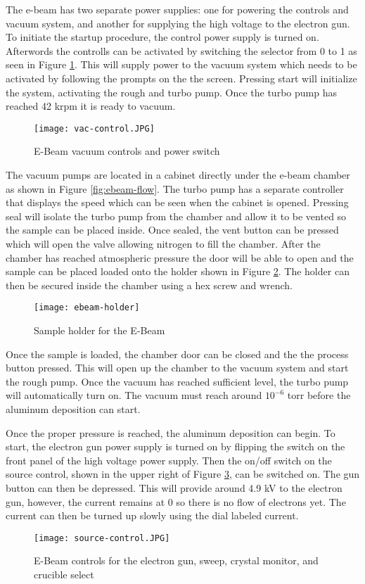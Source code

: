 The e-beam has two separate power supplies: one for powering the controls and vacuum system, and another for supplying the high voltage to the electron gun.
To initiate the startup procedure, the control power supply is turned on.
Afterwords the controlls can be activated by switching the selector from 0 to 1 as seen in Figure \ref{fig:vac-control}.
This will supply power to the vacuum system which needs to be activated by following the prompts on the the screen.
Pressing start will initialize the system, activating the rough and turbo pump.
Once the turbo pump has reached 42 krpm it is ready to vacuum.
\begin{figure}[htpb]
\centering
\texttt{[image: vac-control.JPG]}
\caption{E-Beam vacuum controls and power switch}
\label{fig:vac-control}
\end{figure}

The vacuum pumps are located in a cabinet directly under the e-beam chamber as shown in Figure \ref{fig:ebeam-flow}.
The turbo pump has a separate controller that displays the speed which can be seen when the cabinet is opened.
Pressing seal will isolate the turbo pump from the chamber and allow it to be vented so the sample can be placed inside.
Once sealed, the vent button can be pressed which will open the valve allowing nitrogen to fill the chamber.
After the chamber has reached atmospheric pressure the door will be able to open and the sample can be placed loaded onto the holder shown in Figure \ref{fig:ebeam-holder}.
The holder can then be secured inside the chamber using a hex screw and wrench.
\begin{figure}[htpb]
\centering
\texttt{[image: ebeam-holder]}
\caption{Sample holder for the E-Beam}
\label{fig:ebeam-holder}
\end{figure}
Once the sample is loaded, the chamber door can be closed and the the process button pressed.
This will open up the chamber to the vacuum system and start the rough pump.
Once the vacuum has reached sufficient level, the turbo pump will automatically turn on.
The vacuum must reach around $10^{-6}$ torr before the aluminum deposition can start.

Once the proper pressure is reached, the aluminum deposition can begin.
To start, the electron gun power supply is turned on by flipping the switch on the front panel of the high voltage power supply.
Then the on/off switch on the source control, shown in the upper right of Figure \ref{fig:source-control}, can be switched on.
The gun button can then be depressed.
This will provide around 4.9 kV to the electron gun, however, the current remains at 0 so there is no flow of electrons yet.
The current can then be turned up slowly using the dial labeled current.
\begin{figure}[htpb]
\centering
\texttt{[image: source-control.JPG]}
\caption{E-Beam controls for the electron gun, sweep, crystal monitor, and crucible select}
\label{fig:source-control}
\end{figure}

